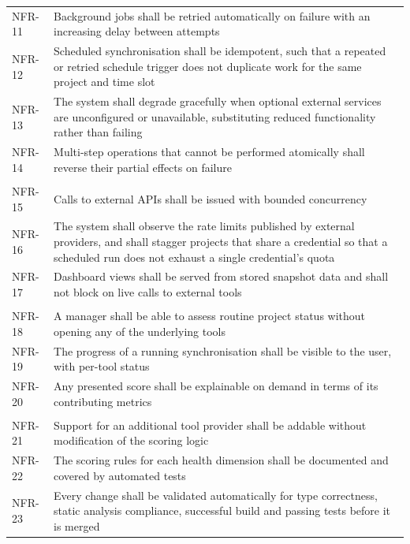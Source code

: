 \begin{longtable}{
  >{\raggedright\arraybackslash}p{}
  >{\raggedright\arraybackslash}p{}
}
\addlinespace
NFR-11 & Background jobs shall be retried automatically on failure with an increasing
delay between attempts \\
\addlinespace
NFR-12 & Scheduled synchronisation shall be idempotent, such that a repeated or
retried schedule trigger does not duplicate work for the same project and time slot
\\
\addlinespace
NFR-13 & The system shall degrade gracefully when optional external services are
unconfigured or unavailable, substituting reduced functionality rather than failing
\\
\addlinespace
NFR-14 & Multi-step operations that cannot be performed atomically shall reverse
their partial effects on failure \\
\addlinespace
\multicolumn{2}{l}{\textit{Performance and Efficiency}} \\
\addlinespace
NFR-15 & Calls to external APIs shall be issued with bounded concurrency \\
\addlinespace
NFR-16 & The system shall observe the rate limits published by external providers,
and shall stagger projects that share a credential so that a scheduled run does not
exhaust a single credential's quota \\
\addlinespace
NFR-17 & Dashboard views shall be served from stored snapshot data and shall not
block on live calls to external tools \\
\addlinespace
\multicolumn{2}{l}{\textit{Usability}} \\
\addlinespace
NFR-18 & A manager shall be able to assess routine project status without opening any
of the underlying tools \\
\addlinespace
NFR-19 & The progress of a running synchronisation shall be visible to the user, with
per-tool status \\
\addlinespace
NFR-20 & Any presented score shall be explainable on demand in terms of its
contributing metrics \\
\addlinespace
\multicolumn{2}{l}{\textit{Maintainability}} \\
\addlinespace
NFR-21 & Support for an additional tool provider shall be addable without
modification of the scoring logic \\
\addlinespace
NFR-22 & The scoring rules for each health dimension shall be documented and covered
by automated tests \\
\addlinespace
NFR-23 & Every change shall be validated automatically for type correctness, static
analysis compliance, successful build and passing tests before it is merged \\

\end{longtable}
